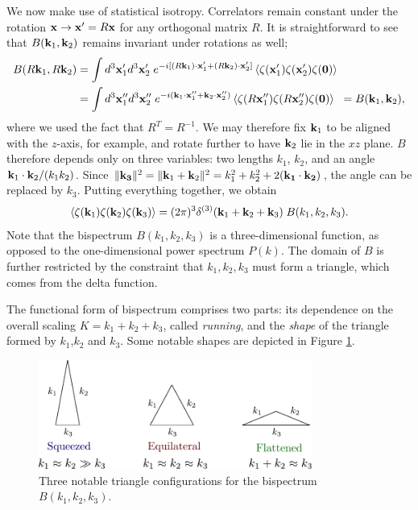 We now make use of statistical isotropy. Correlators remain constant under the rotation $\mathbf{x} \rightarrow \mathbf{x}' = R \mathbf{x}$ for any orthogonal matrix $R$. It is straightforward to see that $B(\mathbf{k}_1,\mathbf{k}_2)$ remains invariant under rotations as well;
\begin{align}
	B(R\mathbf{k}_1, R\mathbf{k}_2) &= \int d^3\mathbf{x}'_1 d^3\mathbf{x}'_2 \; e^{-i[ (R\mathbf{k}_1) \cdot \mathbf{x}'_1 + (R\mathbf{k}_2) \cdot \mathbf{x}'_2]} \left< \zeta(\mathbf{x}'_1) \zeta(\mathbf{x}'_2) \zeta(\mathbf{0}) \right> \\
	&= \int d^3\mathbf{x}''_1 d^3\mathbf{x}''_2 \; e^{-i( \mathbf{k}_1 \cdot \mathbf{x}''_1 + \mathbf{k}_2 \cdot \mathbf{x}''_2)} \left< \zeta(R \mathbf{x}''_1) \zeta(R \mathbf{x}''_2) \zeta(\mathbf{0}) \right> \;\;= B(\mathbf{k}_1, \mathbf{k}_2),
\end{align}
where we used the fact that $R^T=R^{-1}$. We may therefore fix $\mathbf{k}_1$ to be aligned with the $z$-axis, for example, and rotate further to have $\mathbf{k}_2$ lie in the $xz$ plane. $B$ therefore depends only on three variables: two lengths $k_1$, $k_2$, and an angle $\mathbf{k}_1 \cdot \mathbf{k}_2 / (k_1 k_2)$. Since $\| \mathbf{k_3} \|^2 = \| \mathbf{k}_1+\mathbf{k}_2 \|^2 = k_1^2 + k_2^2 + 2(\mathbf{k_1}\cdot\mathbf{k_2})$, the angle can be replaced by $k_3$. Putting everything together, we obtain
\begin{align}
	\left< \zeta(\mathbf{k}_1) \zeta(\mathbf{k}_2) \zeta(\mathbf{k}_3) \right> =  (2\pi)^3 \delta^{(3)}(\mathbf{k}_1 + \mathbf{k}_2 + \mathbf{k}_3) \; B(k_1, k_2, k_3).
\end{align}
Note that the bispectrum $B(k_1,k_2,k_3)$ is a three-dimensional function, as opposed to the one-dimensional power spectrum $P(k)$. The domain of $B$ is further restricted by the constraint that $k_1,k_2,k_3$ must form a triangle, which comes from the delta function.

The functional form of bispectrum comprises two parts: its dependence on the overall scaling $K=k_1+k_2+k_3$, called \textit{running}, and the \textit{shape} of the triangle formed by $k_1$,$k_2$ and $k_3$. Some notable shapes are depicted in Figure \ref{fig:triangle_configurations}.

\begin{figure}
	\centering
	\includegraphics[width=0.8\textwidth]{triangle_configurations.pdf}
	\hspace{10pt}
	\caption{Three notable triangle configurations for the bispectrum $B(k_1,k_2,k_3)$.}
	\label{fig:triangle_configurations}
\end{figure}

